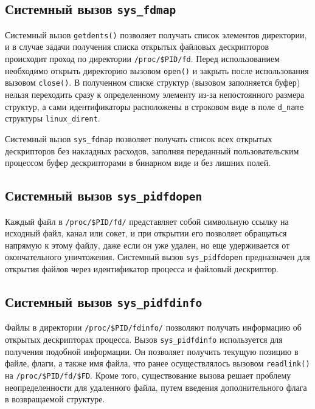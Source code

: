 \subsection{Системный вызов \texttt{sys\_fdmap}}
\label{sub:sys:sys_fdmap}

Системный вызов \texttt{getdents()} позволяет получать список элементов
директории, и в случае задачи получения списка открытых файловых
дескрипторов происходит проход по директории \texttt{/proc/\$PID/fd}. Перед
использованием необходимо открыть директорию вызовом \texttt{open()} и закрыть
после использования вызовом \texttt{close()}. В полученном списке структур
(вызовом заполняется буфер) нельзя переходить сразу к определенному элементу
из-за непостоянного размера структур, а сами идентификаторы расположены в
строковом виде в поле \texttt{d\_name} структуры \texttt{linux\_dirent}.

Системный вызов \texttt{sys\_fdmap} позволяет получать список всех открытых
дескрипторов без накладных расходов, заполняя переданный пользовательским
процессом буфер дескрипторами в бинарном виде и без лишних полей.

\subsection{Системный вызов \texttt{sys\_pidfdopen}}
\label{sub:sys:sys_pidfdopen}

Каждый файл в \texttt{/proc/\$PID/fd/} представляет собой символьную ссылку на
исходный файл, канал или сокет, и при открытии его позволяет обращаться напрямую
к этому файлу, даже если он уже удален, но еще удерживается от окончательного
уничтожения. Системный вызов \texttt{sys\_pidfdopen} предназначен для открытия
файлов через идентификатор процесса и файловый дескриптор. 

\subsection{Системный вызов \texttt{sys\_pidfdinfo}}
\label{sub:sys:sys_pidfdinfo}

Файлы в директории \texttt{/proc/\$PID/fdinfo/} позволяют получать информацию
об открытых дескрипторах процесса. Вызов
\texttt{sys\_pidfdinfo} используется для получения подобной информации. Он
позволяет получить текущую позицию в файле, флаги, а также имя файла, что ранее
осуществлялось вызовом \texttt{readlink()} на \texttt{/proc/\$PID/fd/\$FD}.
Кроме того, существование вызова решает проблему неопределенности для удаленного
файла, путем введения дополнительного флага в возвращаемой структуре.

